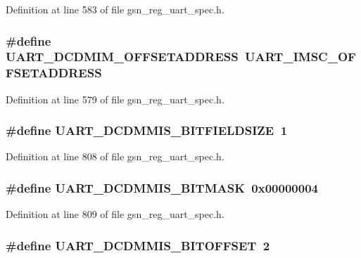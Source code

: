 Definition at line 583 of file gsn\_\-reg\_\-uart\_\-spec.h.

\hypertarget{a00575_a2984be353b32cad1430971ddc5602c37}{
\subsubsection[{UART\_\-DCDMIM\_\-OFFSETADDRESS}]{\setlength{\rightskip}{0pt plus 5cm}\#define UART\_\-DCDMIM\_\-OFFSETADDRESS~UART\_\-IMSC\_\-OFFSETADDRESS}}
\label{a00575_a2984be353b32cad1430971ddc5602c37}


Definition at line 579 of file gsn\_\-reg\_\-uart\_\-spec.h.

\hypertarget{a00575_a2916b9173d4972dc4d9d21143d335a0e}{
\subsubsection[{UART\_\-DCDMMIS\_\-BITFIELDSIZE}]{\setlength{\rightskip}{0pt plus 5cm}\#define UART\_\-DCDMMIS\_\-BITFIELDSIZE~1}}
\label{a00575_a2916b9173d4972dc4d9d21143d335a0e}


Definition at line 808 of file gsn\_\-reg\_\-uart\_\-spec.h.

\hypertarget{a00575_ab54cc94ea4043e1fa6b86f52186abf58}{
\subsubsection[{UART\_\-DCDMMIS\_\-BITMASK}]{\setlength{\rightskip}{0pt plus 5cm}\#define UART\_\-DCDMMIS\_\-BITMASK~0x00000004}}
\label{a00575_ab54cc94ea4043e1fa6b86f52186abf58}


Definition at line 809 of file gsn\_\-reg\_\-uart\_\-spec.h.

\hypertarget{a00575_a39ec2ffd00c50bce447e9db8f7d27288}{
\subsubsection[{UART\_\-DCDMMIS\_\-BITOFFSET}]{\setlength{\rightskip}{0pt plus 5cm}\#define UART\_\-DCDMMIS\_\-BITOFFSET~2}}
\label{a00575_a39ec2ffd00c50bce447e9db8f7d27288}


